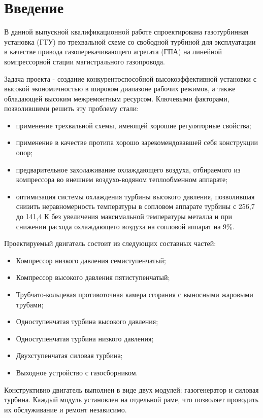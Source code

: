 \section*{Введение}

В данной выпускной квалификационной работе спроектирована газотурбинная установка
(ГТУ) по трехвальной схеме со свободной турбиной для эксплуатации в качестве привода
газоперекачивающего агрегата (ГПА) на линейной компрессорной стации магистрального
газопровода.

Задача проекта - создание конкурентоспособной высокоэффективной установки с высокой
экономичностью в широком диапазоне рабочих режимов, а также обладающей высоким межремонтным ресурсом.
Ключевыми факторами, позволившими решить эту проблему стали:
\begin{itemize}
    \item применение трехвальной схемы, имеющей хорошие регуляторные свойства;
    \item применение в качестве протипа хорошо зарекомендовавшей себя конструкции опор;
    \item предварительное захолаживание охлаждающего воздуха, отбираемого из компрессора во внешнем воздухо-водяном теплообменном аппарате;
    \item оптимизация системы охлаждения турбины высокого давления, позволившая снизить неравномерность температуры в
    сопловом аппарате турбины с 256,7 до 141,4 К без увеличения максимальной температуры металла и при снижении
    расхода охлаждающего воздуха на сопловой аппарат на 9\%.
\end{itemize}

Проектируемый двигатель состоит из следующих составных частей:
\begin{itemize}
    \item Компрессор низкого давления семиступенчатый;
    \item Компрессор высокого давления пятиступенчатый;
    \item Трубчато-кольцевая противоточная камера сгорания с выносными жаровыми трубами;
    \item Одноступенчатая турбина высокого давления;
    \item Одноступенчатая турбина низкого давления;
    \item Двухступенчатая силовая турбина;
    \item Выходное устройство с газосборником.
\end{itemize}

Конструктивно двигатель выполнен в виде двух модулей: газогенератор и силовая турбина. Каждый модуль установлен на отдельной
раме, что позволяет проводить их обслуживание и ремонт независимо.
